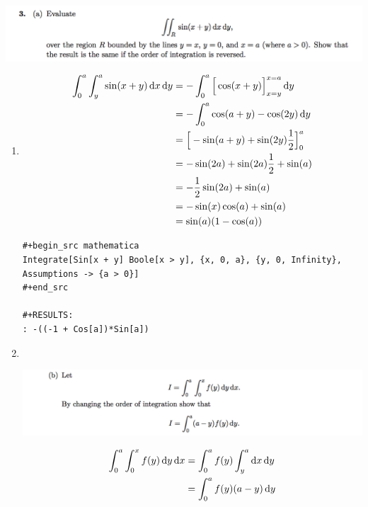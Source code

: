 \documentclass[12pt]{article}
\begin{document}
\newpage
\subsection{}
\begin{mdframed}
\includegraphics[width=400pt]{img/oxford-prelims-M5-multivariable-calc-1-3-a.png}
\end{mdframed}

\begin{enumerate}[label=(\alph*)]
\item
  \begin{align*}
    \int_0^a \int_y^a \sin(x + y) \dx \dy
    &= -\int_0^a \Big[\cos(x + y)\Big]_{x=y}^{x=a} \dy\\
    &= -\int_0^a \cos(a + y) - \cos(2y) \dy\\
    &= \Big[-\sin(a + y) + \sin(2y)\frac{1}{2}\Big]_0^a \\
    &= -\sin(2a) + \sin(2a)\frac{1}{2} + \sin(a)\\
    &= -\frac{1}{2}\sin(2a) + \sin(a)\\
    &= -\sin(x)\cos(a) + \sin(a)\\
    &= \sin(a)(1 - \cos(a))
  \end{align*}

\begin{verbatim}
#+begin_src mathematica
Integrate[Sin[x + y] Boole[x > y], {x, 0, a}, {y, 0, Infinity},  Assumptions -> {a > 0}]
#+end_src

#+RESULTS:
: -((-1 + Cos[a])*Sin[a])

\end{verbatim}

\newpage
\item~\\
  \begin{mdframed}
    \includegraphics[width=400pt]{img/oxford-prelims-M5-multivariable-calc-1-3-b.png}
  \end{mdframed}
  \begin{align*}
    \int_0^a\int_0^x f(y) \dy \dx
    &= \int_0^a f(y) \int_y^a \dx \dy\\
    &= \int_0^a f(y) (a - y) \dy\\
  \end{align*}
\end{enumerate}
\end{document}
